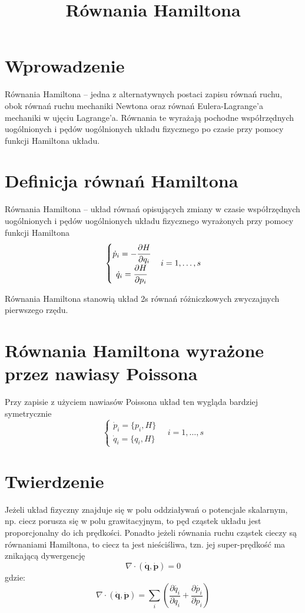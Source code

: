\documentclass{article}
\begin{document}
\title{Równania Hamiltona}
\maketitle

\section*{Wprowadzenie}
Równania Hamiltona – jedna z alternatywnych postaci zapisu równań ruchu, obok równań ruchu mechaniki Newtona oraz równań Eulera-Lagrange’a mechaniki w ujęciu Lagrange’a. Równania te wyrażają pochodne współrzędnych uogólnionych i pędów uogólnionych układu fizycznego po czasie przy pomocy funkcji Hamiltona układu. 

\section*{Definicja równań Hamiltona}
Równania Hamiltona – układ równań opisujących zmiany w czasie współrzędnych uogólnionych i pędów uogólnionych układu fizycznego wyrażonych przy pomocy funkcji Hamiltona 
\begin{displaymath}
\left\{{\begin{matrix}{\dot {p}}_{i}=-{\cfrac {\partial H}{\partial q_{i}}}\\[.5em]{\dot {q}}_{i}={\cfrac {\partial H}{\partial p_{i}}}\end{matrix}}\right.\quad i=1,\dots ,s
\end{displaymath}

Równania Hamiltona stanowią układ 2s równań różniczkowych zwyczajnych pierwszego rzędu. 

\section*{Równania Hamiltona wyrażone przez nawiasy Poissona}
Przy zapisie z użyciem nawiasów Poissona układ ten wygląda bardziej symetrycznie 
\begin{equation*}
\left\{{\begin{matrix}{\dot {p}}_{i}=\{p_{i},H\}\\[.5em]{\dot {q}}_{i}=\{q_{i},H\}\end{matrix}}\right.\quad i=1,\dots ,s
\end{equation*}

\section*{Twierdzenie}
Jeżeli układ fizyczny znajduje się w polu oddziaływań o potencjale skalarnym, np. ciecz porusza się w polu grawitacyjnym, to pęd cząstek układu jest proporcjonalny do ich prędkości. Ponadto jeżeli równania ruchu cząstek cieczy są równaniami Hamiltona, to ciecz ta jest nieściśliwa, tzn. jej super-prędkość ma znikającą dywergencję
$$ \nabla \cdot ({\dot {\mathbf {q} }},{\dot {\mathbf {p} }})=0 $$
gdzie:
\[ \nabla \cdot ({\dot {\mathbf {q} }},{\dot {\mathbf {p} }})=\sum _{i}\left({\frac {\partial {\dot {q_{i}}}}{\partial q_{i}}}+{\frac {\partial {\dot {p_{i}}}}{\partial p_{i}}}\right) \]
\end{document}

